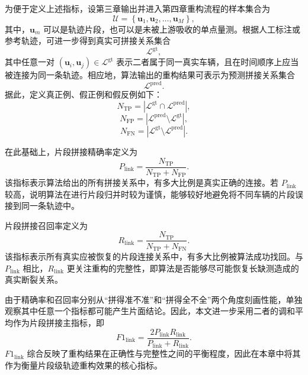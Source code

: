 \documentclass{xdupgthesis}
\begin{document}
为便于定义上述指标，设第三章输出并进入第四章重构流程的样本集合为
\begin{equation}
	\mathcal{U}=\left\{\mathbf{u}_1,\mathbf{u}_2,\ldots,\mathbf{u}_M\right\},
\end{equation}
其中，$\mathbf{u}_m$ 可以是轨迹片段，也可以是未被上游吸收的单点量测。根据人工标注或参考轨迹，可进一步得到真实可拼接关系集合
\begin{equation}
	\mathcal{L}^{\mathrm{gt}},
\end{equation}
其中任意一对 $\left(\mathbf{u}_i,\mathbf{u}_j\right)\in\mathcal{L}^{\mathrm{gt}}$ 表示二者属于同一真实车辆，且在时间顺序上应当被连接为同一条轨迹。相应地，算法输出的重构结果可表示为预测拼接关系集合
\begin{equation}
	\mathcal{L}^{\mathrm{pred}}.
\end{equation}
据此，定义真正例、假正例和假反例如下：
\begin{equation}
	N_{\mathrm{TP}}=\left|\mathcal{L}^{\mathrm{gt}}\cap\mathcal{L}^{\mathrm{pred}}\right|,
\end{equation}
\begin{equation}
	N_{\mathrm{FP}}=\left|\mathcal{L}^{\mathrm{pred}}\setminus\mathcal{L}^{\mathrm{gt}}\right|,
\end{equation}
\begin{equation}
	N_{\mathrm{FN}}=\left|\mathcal{L}^{\mathrm{gt}}\setminus\mathcal{L}^{\mathrm{pred}}\right|.
\end{equation}

在此基础上，片段拼接精确率定义为
\begin{equation}
	P_{\mathrm{link}}
	=
	\frac{N_{\mathrm{TP}}}{N_{\mathrm{TP}}+N_{\mathrm{FP}}}.
\end{equation}
该指标表示算法给出的所有拼接关系中，有多大比例是真实正确的连接。若 $P_{\mathrm{link}}$ 较高，说明算法在进行片段归并时较为谨慎，能够较好地避免将不同车辆的片段误接到同一条轨迹中。

片段拼接召回率定义为
\begin{equation}
	R_{\mathrm{link}}
	=
	\frac{N_{\mathrm{TP}}}{N_{\mathrm{TP}}+N_{\mathrm{FN}}}.
\end{equation}
该指标表示所有真实应被恢复的片段连接关系中，有多大比例被算法成功找回。与 $P_{\mathrm{link}}$ 相比，$R_{\mathrm{link}}$ 更关注重构的完整性，即算法是否能够尽可能恢复长缺测造成的真实断裂关系。

由于精确率和召回率分别从“拼得准不准”和“拼得全不全”两个角度刻画性能，单独观察其中任意一个指标都可能产生片面结论。因此，本文进一步采用二者的调和平均作为片段拼接主指标，即
\begin{equation}
	F1_{\mathrm{link}}
	=
	\frac{2P_{\mathrm{link}}R_{\mathrm{link}}}{P_{\mathrm{link}}+R_{\mathrm{link}}}.
\end{equation}
$F1_{\mathrm{link}}$ 综合反映了重构结果在正确性与完整性之间的平衡程度，因此在本章中将其作为衡量片段级轨迹重构效果的核心指标。
\end{document}
